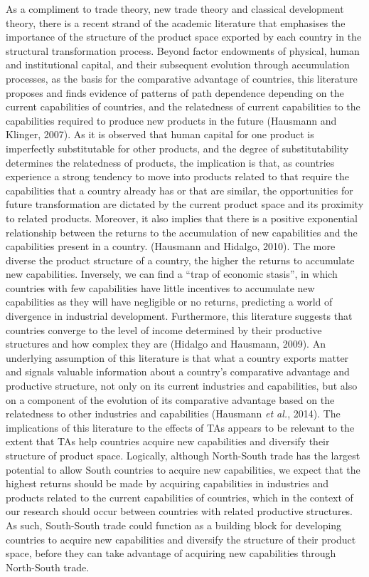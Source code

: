\documentclass[12pt]{article}%
\begin{document}
%
As a compliment to trade theory, new trade theory and classical
development theory, there is a recent strand of the academic literature
that emphasises the importance of the structure of the product space
exported by each country in the structural transformation process.
Beyond factor endowments of physical, human and institutional capital,
and their subsequent evolution through accumulation processes, as the
basis for the comparative advantage of countries, this literature
proposes and finds evidence of patterns of path dependence depending on
the current capabilities of countries, and the relatedness of current
capabilities to the capabilities required to produce new products in the
future (Hausmann and Klinger, 2007). As it is observed that human
capital for one product is imperfectly substitutable for other products,
and the degree of substitutability determines the relatedness of
products, the implication is that, as countries experience a strong
tendency to move into products related to that require the capabilities
that a country already has or that are similar, the opportunities for
future transformation are dictated by the current product space and its
proximity to related products. Moreover, it also implies that there is a
positive exponential relationship between the returns to the
accumulation of new capabilities and the capabilities present in a
country. (Hausmann and Hidalgo, 2010). The more diverse the product
structure of a country, the higher the returns to accumulate new
capabilities. Inversely, we can find a ``trap of economic stasis'', in
which countries with few capabilities have little incentives to
accumulate new capabilities as they will have negligible or no returns,
predicting a world of divergence in industrial development. Furthermore,
this literature suggests that countries converge to the level of income
determined by their productive structures and how complex they are
(Hidalgo and Hausmann, 2009). An underlying assumption of this
literature is that what a country exports matter and signals valuable
information about a country's comparative advantage and productive
structure, not only on its current industries and capabilities, but also
on a component of the evolution of its comparative advantage based on
the relatedness to other industries and capabilities (Hausmann \emph{et
al.}, 2014). The implications of this literature to the effects of TAs
appears to be relevant to the extent that TAs help countries acquire new
capabilities and diversify their structure of product space. Logically,
although North-South trade has the largest potential to allow South
countries to acquire new capabilities, we expect that the highest
returns should be made by acquiring capabilities in industries and
products related to the current capabilities of countries, which in the
context of our research should occur between countries with related
productive structures. As such, South-South trade could function as a
building block for developing countries to acquire new capabilities and
diversify the structure of their product space, before they can take
advantage of acquiring new capabilities through North-South trade.
%
\end{document}
